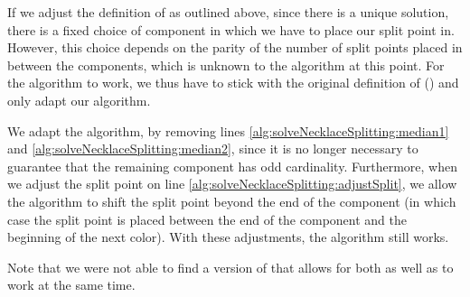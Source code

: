 \documentclass[a4paper,UKenglish,cleveref, thm-restate]{lipics-v2021}
\begin{document}
If we adjust the definition of \TwoThiefNecklaceSplitting as outlined above, since there is a unique solution, there is a fixed choice of component in which we have to place our split point in. However, this choice depends on the parity of the number of split points placed in between the components, which is unknown to the algorithm at this point. For the algorithm to work, we thus have to stick with the original definition of \TwoThiefNecklaceSplitting () and only adapt our algorithm.

We adapt the algorithm, by removing lines \ref{alg:solveNecklaceSplitting:median1} and \ref{alg:solveNecklaceSplitting:median2}, since it is no longer necessary to guarantee that the remaining component has odd cardinality. Furthermore, when we adjust the split point on line \ref{alg:solveNecklaceSplitting:adjustSplit}, we allow the algorithm to shift the split point beyond the end of the component (in which case the split point is placed between the end of the component and the beginning of the next color). With these adjustments, the algorithm still works.

Note that we were not able to find a version of  that allows for both  as well as  to work at the same time.
\end{document}
